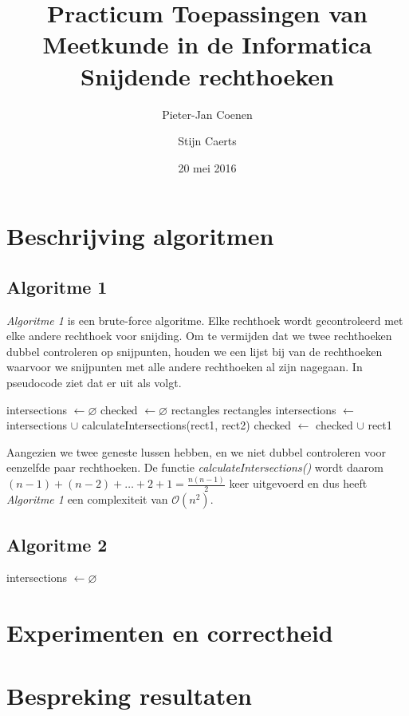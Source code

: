 \documentclass[11pt,a4paper,titlepage]{article}
\author{Pieter-Jan Coenen \and Stijn Caerts}
\title{Practicum Toepassingen van Meetkunde in de Informatica \\ Snijdende rechthoeken}
\date{20 mei 2016}
\begin{document}
	\maketitle
	\tableofcontents
	\newpage
	\section{Beschrijving algoritmen}
	\subsection{Algoritme 1}
	\emph{Algoritme 1} is een brute-force algoritme. Elke rechthoek wordt gecontroleerd met elke andere rechthoek voor snijding. Om te vermijden dat we twee rechthoeken dubbel controleren op snijpunten, houden we een lijst bij van de rechthoeken waarvoor we snijpunten met alle andere rechthoeken al zijn nagegaan. In pseudocode ziet dat er uit als volgt.
	\begin{algorithm}[H]
		\caption{}
		\begin{algorithmic}[1]
			\State intersections $\gets \varnothing $
			\State checked $\gets \varnothing $
			 {rectangles}
				 {rectangles}
						\State intersections $ \gets $ intersections $ \cup $ calculateIntersections(rect1, rect2)
					\EndIf
				\EndForEach
				\State checked $\gets$ checked $\cup$ rect1
			\EndForEach
		\end{algorithmic}
	\end{algorithm}
	Aangezien we twee geneste lussen hebben, en we niet dubbel controleren voor eenzelfde paar rechthoeken. De functie \emph{calculateIntersections()} wordt daarom $ (n-1) + (n-2) + \dots + 2 + 1 = \frac{n(n-1)}{2} $ keer uitgevoerd en dus heeft \emph{Algoritme 1} een complexiteit van $\mathcal{O}(n^2)$.
	
	\subsection{Algoritme 2}
	\begin{algorithm}[H]
		\caption{}
		\begin{algorithmic}[1]
			\State intersections $\gets \varnothing $
			
		\end{algorithmic}
	\end{algorithm}
	\section{Experimenten en correctheid}
	\section{Bespreking resultaten}
	
\end{document}
